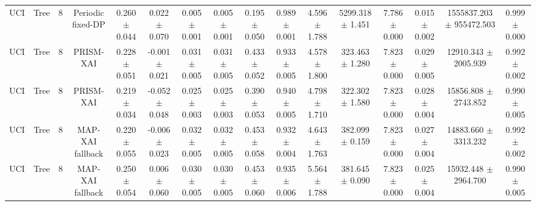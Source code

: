 \begin{tabular}{lccccccccccccccc}
UCI & Tree & 8 & Periodic fixed-DP & 0.260 $\pm$ 0.044 & 0.022 $\pm$ 0.070 & 0.005 $\pm$ 0.001 & 0.005 $\pm$ 0.001 & 0.195 $\pm$ 0.050 & 0.989 $\pm$ 0.001 & 4.596 $\pm$ 1.788 & 5299.318 $\pm$ 1.451 & 7.786 $\pm$ 0.000 & 0.015 $\pm$ 0.002 & 1555837.203 $\pm$ 955472.503 & 0.999 $\pm$ 0.000 \\
UCI & Tree & 8 & PRISM-XAI & 0.228 $\pm$ 0.051 & -0.001 $\pm$ 0.021 & 0.031 $\pm$ 0.005 & 0.031 $\pm$ 0.005 & 0.433 $\pm$ 0.052 & 0.933 $\pm$ 0.005 & 4.578 $\pm$ 1.800 & 323.463 $\pm$ 1.280 & 7.823 $\pm$ 0.000 & 0.029 $\pm$ 0.005 & 12910.343 $\pm$ 2005.939 & 0.992 $\pm$ 0.002 \\
UCI & Tree & 8 & PRISM-XAI & 0.219 $\pm$ 0.034 & -0.052 $\pm$ 0.048 & 0.025 $\pm$ 0.003 & 0.025 $\pm$ 0.003 & 0.390 $\pm$ 0.053 & 0.940 $\pm$ 0.005 & 4.798 $\pm$ 1.710 & 322.302 $\pm$ 1.580 & 7.823 $\pm$ 0.000 & 0.028 $\pm$ 0.004 & 15856.808 $\pm$ 2743.852 & 0.990 $\pm$ 0.005 \\
UCI & Tree & 8 & MAP-XAI fallback & 0.220 $\pm$ 0.055 & -0.006 $\pm$ 0.023 & 0.032 $\pm$ 0.005 & 0.032 $\pm$ 0.005 & 0.453 $\pm$ 0.058 & 0.932 $\pm$ 0.004 & 4.643 $\pm$ 1.763 & 382.099 $\pm$ 0.159 & 7.823 $\pm$ 0.000 & 0.027 $\pm$ 0.004 & 14883.660 $\pm$ 3313.232 & 0.992 $\pm$ 0.002 \\
UCI & Tree & 8 & MAP-XAI fallback & 0.250 $\pm$ 0.054 & 0.006 $\pm$ 0.060 & 0.030 $\pm$ 0.005 & 0.030 $\pm$ 0.005 & 0.453 $\pm$ 0.060 & 0.935 $\pm$ 0.006 & 5.564 $\pm$ 1.788 & 381.645 $\pm$ 0.090 & 7.823 $\pm$ 0.000 & 0.025 $\pm$ 0.004 & 15932.448 $\pm$ 2964.700 & 0.990 $\pm$ 0.005 \\
\bottomrule
\end{tabular}
